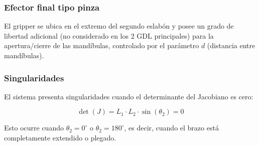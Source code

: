 

\subsubsection{Efector final tipo pinza
}

El gripper se ubica en el extremo del segundo eslabón y posee un grado de libertad adicional (no considerado en los 2 GDL principales) para la apertura/cierre de las mandíbulas, controlado por el parámetro $d$ (distancia entre mandíbulas).

\subsubsection{Singularidades}

El sistema presenta singularidades cuando el determinante del Jacobiano es cero:

\begin{equation}
    \det(J) = L_1 \cdot L_2 \cdot \sin(\theta_2) = 0
\end{equation}

Esto ocurre cuando \(\theta_2 = 0^\circ \) o \(\theta_2 = 180^\circ\), es decir, cuando el brazo está completamente extendido o plegado.

